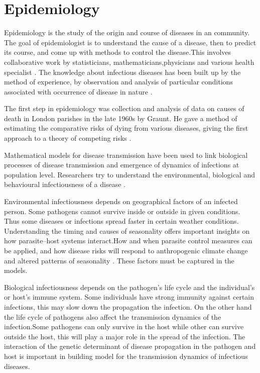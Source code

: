  \section{Epidemiology}
 
 Epidemiology is the study of the origin and course of diseases in an community. The goal of epidemiologist is to understand the cause of a disease, then to predict its course, and come up with methods to control the disease.This
involves collaborative work by statisticians, mathematicians,physicians and various health specialist \citep{Brauer2017}.
The knowledge about infectious diseases has been built up by the method of experience, by
observation and analysis of particular conditions associated with occurrence of disease in nature \citep{frost1923importance}.
 
The first step in epidemiology was collection and analysis of data on causes of death in London parishes in the late 1960s by Graunt.
He  gave a method of estimating the comparative risks of dying from various diseases, giving the first approach to a theory of competing risks \citep{Brauer2017}.
 
 Mathematical models for disease transmission have been used to link biological processes of disease transmission and emergence of dynamics of infections at  population level. Researchers try to understand the environmental, biological  and behavioural infectiousness of a disease .
 
 Environmental infectiousness depends on geographical factors of an infected person. Some pathogens cannot survive inside or outside in given conditions. Thus some diseases or infections spread faster in certain weather conditions\citep{grass}.
Understanding the timing and causes of seasonality offers important insights on how parasite–host systems interact.How and when parasite control measures can be applied, and how disease risks will respond to anthropogenic climate change and altered patterns of seasonality \citep{altizer}. These factors must be captured in the models.
  
Biological infectiousness depends on the pathogen's life cycle and the individual's or host's immune system. Some individuals have strong immunity against certain infections, this may  slow down the propagation the infection. On the other hand the life cycle of  pathogens also affect
the transmission dynamics of the infection.Some pathogens can only survive in the host while other can survive outside the host, this will play a major role in the spread of the infection.  The interaction of the genetic determinant of disease propagation in the pathogen and host is important in building model for the transmission dynamics of infectious diseases.
  

